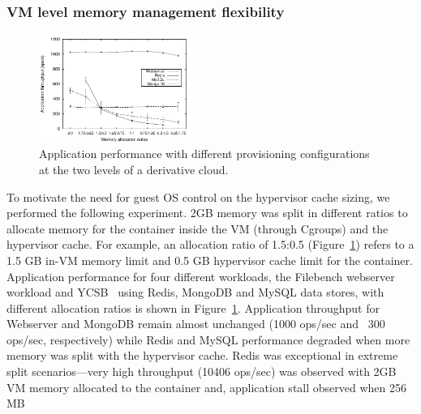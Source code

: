 \subsubsection{VM level memory management flexibility}
\label{subsec:sdc}
%
%
\begin{figure}[t]
  \centering
\includegraphics[width=0.45\textwidth]{images/appl_behavior} 
 \caption{Application performance with different provisioning configurations 
  at the two levels of a derivative cloud.}
 \label{fig:app_behavior} 
\end{figure}
%
To motivate the need for 
guest OS control on the hypervisor cache sizing, we performed the 
following experiment.
%
2GB memory was split in different ratios to allocate memory for the container 
inside the VM (through Cgroups) and the hypervisor cache.
%
For example, an allocation ratio of 1.5:0.5 (Figure~\ref{fig:app_behavior}) refers to
a 1.5 GB in-VM memory limit and 0.5 GB hypervisor cache limit for
the container. 
%
Application performance for four different workloads,
the Filebench webserver workload and YCSB~\cite{ycsb} using 
Redis, MongoDB and MySQL data stores,
with different allocation ratios is shown in 
Figure~\ref{fig:app_behavior}. 
%
Application throughput for Webserver and MongoDB remain almost unchanged 
(1000 ops/sec and ~300 ops/sec, respectively) while Redis and MySQL performance 
degraded when more memory was split with the hypervisor cache.
%
Redis was exceptional in extreme split scenarios---very high throughput (10406 ops/sec) was
observed with 2GB VM memory allocated to the container and, application stall observed when 256 MB 
